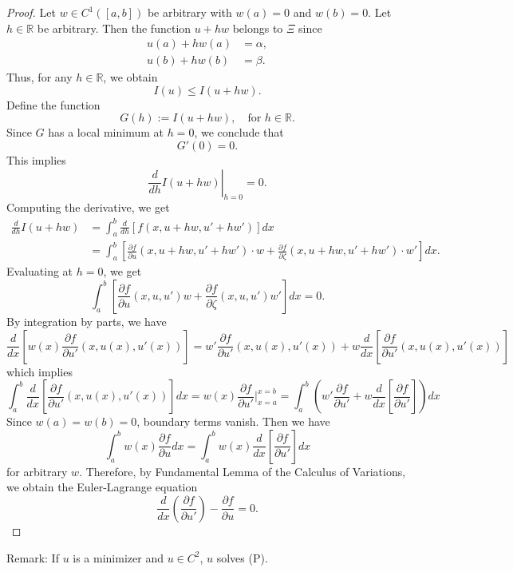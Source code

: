 \documentclass[12pt]{report}
\begin{document}
\begin{proof}
Let $w \in C^1([a,b])$ be arbitrary with $w(a) = 0$ and $w(b) = 0$. Let $h \in \mathbb{R}$ be arbitrary. Then the function $u + hw$ belongs to $\Xi$ since
\begin{align*}
    u(a) + hw(a) &= \alpha, \\
    u(b) + hw(b) &= \beta.
\end{align*}
Thus, for any $h \in \mathbb{R}$, we obtain
\begin{equation}
    I(u) \leq I(u + hw).
\end{equation}
Define the function
\begin{equation}
    G(h) := I(u + hw), \quad \text{for } h \in \mathbb{R}.
\end{equation}
Since $G$ has a local minimum at $h = 0$, we conclude that
\begin{equation}
    G'(0) = 0.
\end{equation}
This implies
\begin{equation}
    \left. \frac{d}{dh} I(u + hw) \right|_{h=0} = 0.
\end{equation}
Computing the derivative, we get
\begin{align*}
    \frac{d}{dh} I(u + hw) &= \int_{a}^{b} \frac{d}{dh} \left[ f(x, u + hw, u' + hw') \right] dx \\
    &= \int_{a}^{b} \left[ \frac{\partial f}{\partial u} (x, u + hw, u' + hw') \cdot w 
    + \frac{\partial f}{\partial \zeta} (x, u + hw, u' + hw') \cdot w' \right] dx.
\end{align*}
Evaluating at $h=0$, we get
\begin{equation}
    \int_{a}^{b} \left[ \frac{\partial f}{\partial u} (x, u, u') w + \frac{\partial f}{\partial \zeta} (x, u, u') w' \right] dx = 0.
\end{equation}
By integration by parts, we have
\[\frac{d}{dx}[w(x)\frac{\partial f}{\partial u'}(x, u(x), u'(x))] = w'\frac{\partial f}{\partial u'}(x, u(x), u'(x)) + w\frac{d}{dx}[\frac{\partial f}{\partial u'}(x, u(x), u'(x))]\]
which implies 
\[\int_a^b \frac{d}{dx}[\frac{\partial f}{\partial u'}(x, u(x), u'(x))]dx =w(x)\frac{\partial f}{\partial u'} |_{x = a}^{x = b} = \int_a^b (w'\frac{\partial f}{\partial u'} + w\frac{d}{dx}[\frac{\partial f}{\partial u'}])dx\]
Since \(w(a) = w(b) = 0\), boundary terms vanish. Then we have 
\[\int_a^b w(x)\frac{\partial f}{\partial u} dx = \int_a^b w(x)\frac{d}{dx}[\frac{\partial f}{\partial u'}] dx\]
for arbitrary \(w\). Therefore, by Fundamental Lemma of the Calculus of Variations, we obtain the Euler-Lagrange equation
\[
    \frac{d}{dx} \left( \frac{\partial f}{\partial u'} \right) - \frac{\partial f}{\partial u} = 0.\]
\end{proof}
Remark: If \(u\) is a minimizer and \(u \in C^2\), \(u\) solves (P). 
\end{document}
